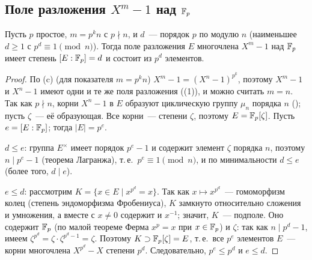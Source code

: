 \par\noindent\begin{minipage}{\linewidth}
\begin{center}
\end{center}
\end{minipage}\par\medskip

\subsection*{Поле разложения $X^m-1$ над $\mathbb F_p$}

\begin{proposition}[2.10c]
Пусть $p$ простое, $m=p^kn$ с $p\nmid n$, и $d$~--- порядок $p$ по модулю $n$ (наименьшее $d\ge1$ с $p^d\equiv1\pmod n$).
Тогда поле разложения $E$ многочлена $X^m-1$ над $\mathbb F_p$ имеет степень $[E:\mathbb F_p]=d$ и состоит из $p^d$ элементов.
\end{proposition}

\begin{proof}
По (c) (для показателя $m=p^kn$) $X^m-1=(X^n-1)^{p^k}$, поэтому $X^m-1$ и $X^n-1$ имеют одни и те же поля разложения ((1)), и можно
считать $m=n$. Так как $p\nmid n$, корни $X^n-1$ в $E$ образуют циклическую группу $\mu_n$ порядка $n$ (); пусть
$\zeta$~--- её образующая. Все корни~--- степени $\zeta$, поэтому $E=\mathbb F_p[\zeta]$. Пусть $e=[E:\mathbb F_p]$; тогда $|E|=p^e$.

$d\le e$: группа $E^\times$ имеет порядок $p^e-1$ и содержит элемент $\zeta$ порядка $n$, поэтому $n\mid p^e-1$ (теорема
Лагранжа), т.\,е.\ $p^e\equiv1\pmod n$, и по минимальности $d\le e$ (более того, $d\mid e$).

$e\le d$: рассмотрим $K=\{x\in E\mid x^{p^d}=x\}$. Так как $x\mapsto x^{p^d}$~--- гомоморфизм колец (степень эндоморфизма
Фробениуса), $K$ замкнуто относительно сложения и умножения, а вместе с $x\ne0$ содержит и $x^{-1}$; значит, $K$~---
подполе. Оно содержит $\mathbb F_p$ (по малой теореме Ферма $x^p=x$ при $x\in\mathbb F_p$) и $\zeta$: так как $n\mid p^d-1$, имеем
$\zeta^{p^d}=\zeta\cdot\zeta^{p^d-1}=\zeta$. Поэтому $K\supset\mathbb F_p[\zeta]=E$, т.\,е.\ все $p^e$ элементов $E$~--- корни многочлена
$X^{p^d}-X$ степени $p^d$. Следовательно, $p^e\le p^d$ и $e\le d$.
\end{proof}

